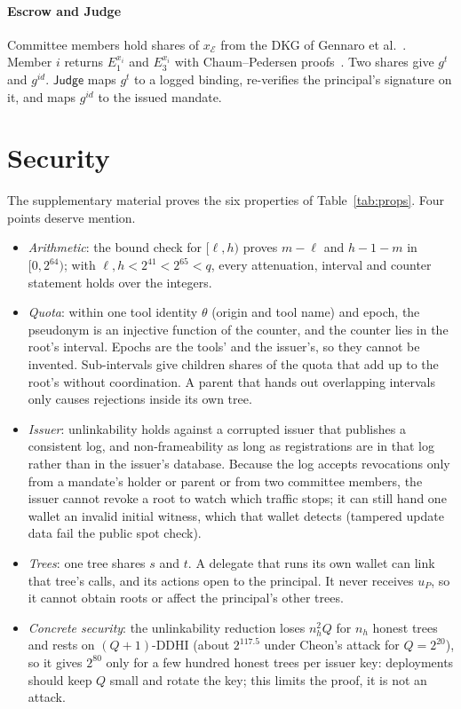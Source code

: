 \paragraph*{Escrow and Judge} Committee members hold shares of $x_{\mathcal{E}}$ from the DKG of Gennaro et al.~\cite{gennaro2007dkg}. Member $i$ returns $E_1^{x_i}$ and $E_3^{x_i}$ with Chaum--Pedersen proofs~\cite{chaum1992dleq}. Two shares give $g^{t}$ and $g^{\mathit{id}}$. $\mathsf{Judge}$ maps $g^{t}$ to a logged binding, re-verifies the principal's signature on it, and maps $g^{\mathit{id}}$ to the issued mandate.

\section{Security}\label{sec:security}
The supplementary material proves the six properties of Table~\ref{tab:props}. Four points deserve mention.
\begin{itemize}
\item \emph{Arithmetic}: the bound check for $[\ell,h)$ proves $m-\ell$ and $h-1-m$ in $[0,2^{64})$; with $\ell,h<2^{41}<2^{65}<q$, every attenuation, interval and counter statement holds over the integers.
\item \emph{Quota}: within one tool identity $\theta$ (origin and tool name) and epoch, the pseudonym is an injective function of the counter, and the counter lies in the root's interval. Epochs are the tools' and the issuer's, so they cannot be invented. Sub-intervals give children shares of the quota that add up to the root's without coordination. A parent that hands out overlapping intervals only causes rejections inside its own tree.
\item \emph{Issuer}: unlinkability holds against a corrupted issuer that publishes a consistent log, and non-frameability as long as registrations are in that log rather than in the issuer's database. Because the log accepts revocations only from a mandate's holder or parent or from two committee members, the issuer cannot revoke a root to watch which traffic stops; it can still hand one wallet an invalid initial witness, which that wallet detects (tampered update data fail the public spot check).
\item \emph{Trees}: one tree shares $s$ and $t$. A delegate that runs its own wallet can link that tree's calls, and its actions open to the principal. It never receives $u_P$, so it cannot obtain roots or affect the principal's other trees.
\item \emph{Concrete security}: the unlinkability reduction loses $n_h^2Q$ for $n_h$ honest trees and rests on $(Q+1)$-DDHI (about $2^{117.5}$ under Cheon's attack for $Q=2^{20}$), so it gives $2^{80}$ only for a few hundred honest trees per issuer key: deployments should keep $Q$ small and rotate the key; this limits the proof, it is not an attack.
\end{itemize}

